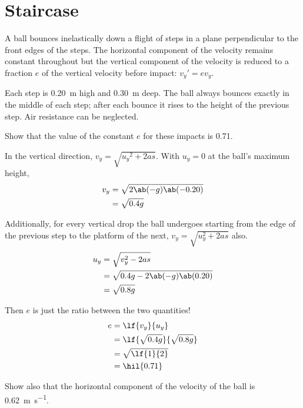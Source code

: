 \section{Staircase}
\begin{problem}
A ball bounces inelastically down a flight of steps in a plane
perpendicular to the front edges of the steps.
The horizontal component of the velocity remains constant throughout
but the vertical component of the velocity is reduced to a fraction
\(e\) of the vertical velocity before impact: \({v_y}' = ev_y\).

Each step is \qty{0.20}{\metre} high and \qty{0.30}{\metre} deep.
The ball always bounces exactly in the middle of each step; after
each bounce it rises to the height of the previous step.
Air resistance can be neglected.

Show that the value of the constant \(e\) for these impacts is
\num{0.71}.
\end{problem}

In the vertical direction, \(v_y = \sqrt{{u_y}^2 +
	2as}\). With \(u_y = 0\)
at the ball's maximum height,
\begin{align*}
	v_y & = \sqrt{2\ab(-g)\ab(-0.20)} \\
	    & = \sqrt{0.4g}
\end{align*}

Additionally, for every vertical drop the ball undergoes starting
from the edge of the previous step to the platform of the next,
\(v_y = \sqrt{u_y^2 + 2as}\) also.
\begin{align*}
	u_y & = \sqrt{v_y^2 - 2as}              \\
	    & = \sqrt{0.4g - 2\ab(-g)\ab(0.20)} \\
	    & = \sqrt{0.8g}
\end{align*}

Then \(e\) is just the ratio between the two quantities!
\begin{align*}
	e & = \lf{v_y}{u_y}                   \\
	  & = \lf{\sqrt{0.4g}}{\sqrt{0.8g}}   \\
	  & = \sqrt{\lf{1}{2}               } \\
	  & = \hil{0.71}
\end{align*}

\begin{problem}
Show also that the horizontal component of the velocity of the
ball is \qty{0.62}{\metre\per\second}.
\end{problem}

